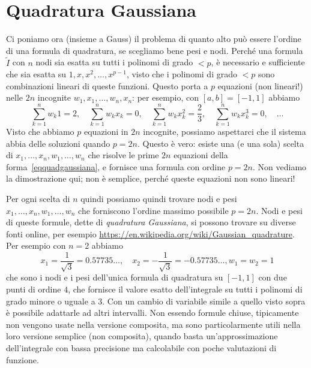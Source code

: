 \documentclass[a4paper]{report}
\theoremstyle{definition}
\theoremstyle{remark}
\newcommand{\checkkey}[1]{%
        \ifstrequal{#1}{inf}{\setbool{showcontent}{true}}{}%
    }
\newenvironment{conditional}[1][]{%
        \setbool{showcontent}{false}%
        \forcsvlist\checkkey{#1}%
        \ifbool{showcontent}{\begingroup}{\expandafter\comment}%
    }{%
        \ifbool{showcontent}{\endgroup}{\expandafter\endcomment}%
    }
\newcommand{\checkkey}[1]{%
        \ifstrequal{#1}{ich}{\setbool{showcontent}{true}}{}%
    }
\newenvironment{conditional}[1][]{%
        \setbool{showcontent}{false}%
        \forcsvlist\checkkey{#1}%
        \ifbool{showcontent}{\begingroup}{\expandafter\comment}%
    }{%
        \ifbool{showcontent}{\endgroup}{\expandafter\endcomment}%
    }
\begin{document}
\begin{conditional}[ich]
\section{Quadratura Gaussiana}
Ci poniamo ora (insieme a Gauss) il problema di quanto alto può essere l'ordine di una formula di quadratura, se scegliamo bene pesi e nodi. Perché una formula $\tilde{I}$ con $n$ nodi sia esatta su tutti i polinomi di grado $ < p$, è necessario e sufficiente che sia esatta su $1, x, x^2, \dots, x^{p-1}$, visto che i polinomi di grado $< p$ sono combinazioni lineari di queste funzioni. Questo porta a $p$ equazioni (non lineari!) nelle $2n$ incognite $w_1,x_1,\dots, w_n,x_n$: per esempio, con $[a,b]=[-1,1]$ abbiamo
\begin{equation} \label{eqquadgaussiana}
    \sum_{k=1}^n w_k 1 = 2, \quad \sum_{k=1}^n w_k x_k = 0, \quad \sum_{k=1}^n w_k x_k^2 = \frac23, \quad \sum_{k=1}^n w_k x_k^3 = 0, \quad \dots    
\end{equation}
Visto che abbiamo $p$ equazioni in $2n$ incognite, possiamo aspettarci che il sistema abbia delle soluzioni quando $p=2n$.  Questo è vero: esiste una (e una sola) scelta di $x_1,\dots,x_n,w_1,\dots,w_n$ che risolve le prime $2n$ equazioni della forma~\eqref{eqquadgaussiana}, e fornisce una formula con ordine $p=2n$. Non vediamo la dimostrazione qui; non è semplice, perché queste equazioni non sono lineari!

Per ogni scelta di $n$ quindi possiamo quindi trovare nodi e pesi $x_1,\dots,x_n,w_1,\dots,w_n$ che forniscono l'ordine massimo possibile $p=2n$. Nodi e pesi di queste formule, dette di \emph{quadratura Gaussiana}, si possono trovare su diverse fonti online, per esempio \url{https://en.wikipedia.org/wiki/Gaussian_quadrature}. Per esempio con $n=2$ abbiamo
\[
x_1 = \frac{1}{\sqrt{3}} = 0.57735\dots, \quad x_2 = -\frac{1}{\sqrt{3}} = -0.57735\dots, w_1=w_2=1
\]
che sono i nodi e i pesi dell'unica formula di quadratura su $[-1,1]$ con due punti di ordine $4$, che fornisce il valore esatto dell'integrale su tutti i polinomi di grado minore o uguale a $3$. Con un cambio di variabile simile a quello visto sopra è possibile adattarle ad altri intervalli. Non essendo formule chiuse, tipicamente non vengono usate nella versione composita, ma sono particolarmente utili nella loro versione semplice (non composita), quando basta un'approssimazione dell'integrale con bassa precisione ma calcolabile con poche valutazioni di funzione.

\end{conditional}
\end{document}
